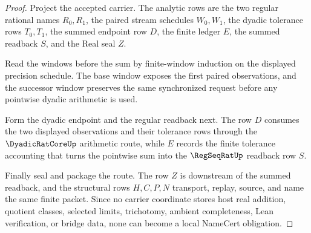 \begin{proof}
Project the accepted carrier. The analytic rows are the two regular rational names $R_0,R_1$, the paired stream schedules $W_0,W_1$, the dyadic tolerance rows $T_0,T_1$, the summed endpoint row $D$, the finite ledger $E$, the summed readback $S$, and the Real seal $Z$.

Read the windows before the sum by finite-window induction on the displayed precision schedule. The base window exposes the first paired observations, and the successor window preserves the same synchronized request before any pointwise dyadic arithmetic is used.

Form the dyadic endpoint and the regular readback next. The row $D$ consumes the two displayed observations and their tolerance rows through the $\DyadicRatCoreUp$ arithmetic route, while $E$ records the finite tolerance accounting that turns the pointwise sum into the $\RegSeqRatUp$ readback row $S$.

Finally seal and package the route. The row $Z$ is downstream of the summed readback, and the structural rows $H,C,P,N$ transport, replay, source, and name the same finite packet. Since no carrier coordinate stores host real addition, quotient classes, selected limits, trichotomy, ambient completeness, Lean verification, or bridge data, none can become a local NameCert obligation.
\end{proof}


